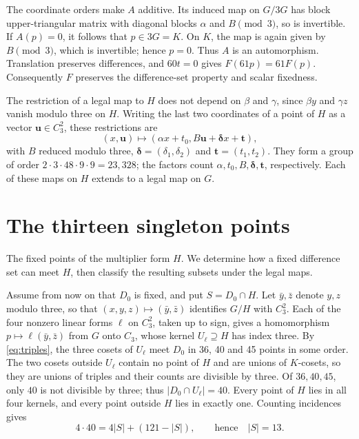 \documentclass[11pt]{article}
\begin{document}
The coordinate orders make $A$ additive. Its induced map on
$G/3G$ has block upper-triangular matrix with diagonal blocks
$\alpha$ and $B\pmod3$, so is invertible. If $A(p)=0$, it follows
that $p\in3G=K$. On $K$, the map is again given by
$B\pmod3$, which is invertible; hence $p=0$.
Thus $A$ is an automorphism. Translation preserves differences,
and $60t=0$ gives $F(61p)=61F(p)$. Consequently $F$ preserves
the difference-set property and scalar fixedness.

The restriction of a legal map to $H$ does not depend on $\beta$ and
$\gamma$, since $\beta y$ and $\gamma z$ vanish modulo three on $H$.
Writing the last two coordinates of a point of $H$ as a vector
$\boldsymbol u\in C_3^2$, these restrictions are
\[
 (x,\boldsymbol u)\longmapsto
 (\alpha x+t_0,B\boldsymbol u+\boldsymbol\delta x+\boldsymbol t),
\]
with $B$ reduced modulo three, $\boldsymbol\delta=(\delta_1,\delta_2)$
and $\boldsymbol t=(t_1,t_2)$.
They form a group of order
$2\cdot3\cdot48\cdot9\cdot9=23{,}328$; the factors count
$\alpha,t_0,B,\boldsymbol\delta,\boldsymbol t$, respectively.
Each of these maps on $H$ extends to a legal map on $G$.

\section{The thirteen singleton points}\label{sec:singletons}

The fixed points of the multiplier form $H$. We determine how a fixed
difference set can meet $H$, then classify the resulting subsets under
the legal maps.

Assume from now on that $D_0$ is fixed, and put $S=D_0\cap H$.
Let $\bar y,\bar z$ denote $y,z$ modulo three, so that
$(x,y,z)\mapsto(\bar y,\bar z)$ identifies $G/H$ with $C_3^2$.
Each of the four nonzero linear forms $\ell$ on $C_3^2$, taken up to
sign, gives a homomorphism $p\mapsto\ell(\bar y,\bar z)$ from $G$ onto
$C_3$, whose kernel $U_\ell\supseteq H$ has index three. By
\eqref{eq:triples}, the three cosets of $U_\ell$ meet $D_0$ in 36, 40
and 45 points in some order. The two cosets outside $U_\ell$ contain no
point of $H$ and are unions of $K$-cosets, so they are unions of
triples and their counts are divisible by three. Of $36,40,45$, only
$40$ is not divisible by three; thus $|D_0\cap U_\ell|=40$.
Every point of $H$ lies in all four kernels, and every point
outside $H$ lies in exactly one. Counting incidences gives
\[
 4\cdot40=4|S|+(121-|S|),\qquad\text{hence}\quad|S|=13.
\]
\end{document}

